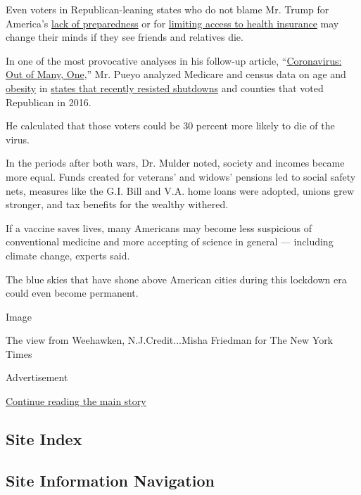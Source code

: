 Even voters in Republican-leaning states who do not blame Mr. Trump for
America's
\href{https://www.nytimes.com/2020/03/28/us/testing-coronavirus-pandemic.html}{lack
of preparedness} or for
\href{https://www.politico.com/news/2020/04/03/trump-obamacare-coronavirus-164285}{limiting
access to health insurance} may change their minds if they see friends
and relatives die.

In one of the most provocative analyses in his follow-up article,
``\href{https://medium.com/@tomaspueyo/coronavirus-out-of-many-one-36b886af37e9}{Coronavirus:
Out of Many, One},'' Mr. Pueyo analyzed Medicare and census data on age
and
\href{https://www.inverse.com/article/33016-trump-voters-more-likely-to-be-fat-no-college-education}{obesity}
in
\href{https://www.nytimes.com/2020/04/03/us/coronavirus-states-without-stay-home.html}{states
that recently resisted shutdowns} and counties that voted Republican in
2016.

He calculated that those voters could be 30 percent more likely to die
of the virus.

In the periods after both wars, Dr. Mulder noted, society and incomes
became more equal. Funds created for veterans' and widows' pensions led
to social safety nets, measures like the G.I. Bill and V.A. home loans
were adopted, unions grew stronger, and tax benefits for the wealthy
withered.

If a vaccine saves lives, many Americans may become less suspicious of
conventional medicine and more accepting of science in general ---
including climate change, experts said.

The blue skies that have shone above American cities during this
lockdown era could even become permanent.

Image

The view from Weehawken, N.J.Credit...Misha Friedman for The New York
Times

Advertisement

\protect\hyperlink{after-bottom}{Continue reading the main story}

\hypertarget{site-index}{%
\subsection{Site Index}\label{site-index}}

\hypertarget{site-information-navigation}{%
\subsection{Site Information
Navigation}\label{site-information-navigation}}

